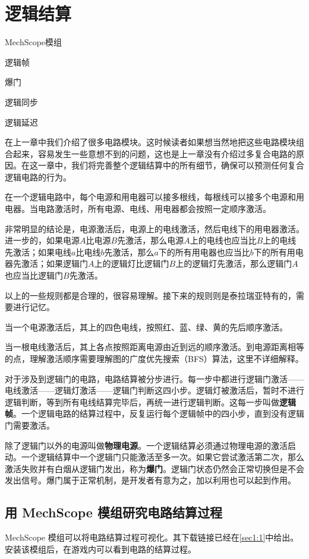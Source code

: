 \chapter{逻辑结算}\label{sec7}

\begin{introduction}
\item MechScope模组
\item 逻辑帧
\item 爆门
\item 逻辑同步
\item 逻辑延迟
\end{introduction}

在上一章中我们介绍了很多电路模块。这时候读者如果想当然地把这些电路模块组合起来，容易发生一些意想不到的问题，这也是上一章没有介绍过多复合电路的原因。在这一章中，我们将完善整个逻辑结算中的所有细节，确保可以预测任何复合逻辑电路的行为。

在一个逻辑电路中，每个电源和用电器可以接多根线，每根线可以接多个电源和用电器。当电路激活时，所有电源、电线、用电器都会按照一定顺序激活。

非常明显的结论是，电源激活后，电源上的电线激活，然后电线下的用电器激活。进一步的，如果电源$A$比电源$B$先激活，那么电源$A$上的电线也应当比$B$上的电线先激活；如果电线$a$比电线$b$先激活，那么$a$下的所有用电器也应当比$b$下的所有用电器先激活；如果逻辑门$A$上的逻辑灯比逻辑门$B$上的逻辑灯先激活，那么逻辑门$A$也应当比逻辑门$B$先激活。

以上的一些规则都是合理的，很容易理解。接下来的规则则是泰拉瑞亚特有的，需要进行记忆。

当一个电源激活后，其上的四色电线，按照红、蓝、绿、黄的先后顺序激活。

当一根电线激活后，其上各点按照距离电源由近到远的顺序激活。到电源距离相等的点，理解激活顺序需要理解图的广度优先搜索（BFS）算法，这里不详细解释。

对于涉及到逻辑门的电路，电路结算被分步进行。每一步中都进行逻辑门激活——电线激活——逻辑灯激活——逻辑门判断这四小步。逻辑灯被激活后，暂时不进行逻辑判断，等到所有电线结算完毕后，再统一进行逻辑判断。这每一步叫做\textbf{逻辑帧}。一个逻辑电路的结算过程中，反复运行每个逻辑帧中的四小步，直到没有逻辑门需要激活。

除了逻辑门以外的电源叫做\textbf{物理电源}。一个逻辑结算必须通过物理电源的激活启动。一个逻辑结算中一个逻辑门只能激活至多一次。如果它尝试激活第二次，那么激活失败并有白烟从逻辑门发出，称为\textbf{爆门}。逻辑门状态仍然会正常切换但是不会发出信号。爆门属于正常机制，是开发者有意为之，加以利用也可以起到作用。

\section{用 MechScope 模组研究电路结算过程}
MechScope 模组可以将电路结算过程可视化。其下载链接已经在\autoref{sec1:1}中给出。安装该模组后，在游戏内可以看到电路的结算过程。

